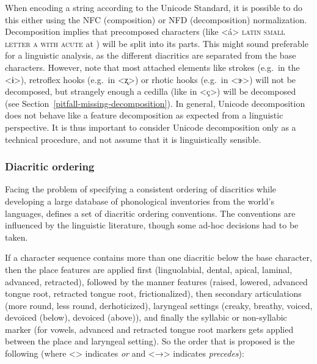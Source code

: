 When encoding a string according to the Unicode Standard, it is possible to do
this either using the NFC (composition) or NFD (decomposition) normalization.
Decomposition implies that precomposed characters (like <á> \textsc{latin small
letter a with acute} at ) will be split into its parts. This might
sound preferable for a linguistic analysis, as the different diacritics are
separated from the base characters. However, note that most attached elements
like strokes (e.g.~in the <ɨ>), retroflex hooks (e.g.~in <ʐ>) or rhotic hooks
(e.g.~in <ɝ>) will not be decomposed, but strangely enough a cedilla (like in
<ç>) will be decomposed (see Section~\ref{pitfall-missing-decomposition}). In
general, Unicode decomposition does not behave like a feature decomposition as
expected from a linguistic perspective. It is thus important to consider Unicode
decomposition only as a technical procedure, and not assume that it is
linguistically sensible.

\subsubsection*{Diacritic ordering}

Facing the problem of specifying a consistent ordering of diacritics while
developing a large database of phonological inventories from the world's
languages, \citet[540]{Moran2012} defines a set of diacritic ordering
conventions. The conventions are influenced by the linguistic literature, though
some ad-hoc decisions had to be taken. 

If a character sequence contains more than one diacritic below the base
character, then the place features are applied first (linguolabial, dental,
apical, laminal, advanced, retracted), followed by the manner features (raised,
lowered, advanced tongue root, retracted tongue root, frictionalized), then
secondary articulations (more round, less round, derhoticized), laryngeal
settings (creaky, breathy, voiced, devoiced (below), devoiced (above)), and
finally the syllabic or non-syllabic marker (for vowels, advanced and retracted
tongue root markers gets applied between the place and laryngeal setting). So
the order that is proposed is the following (where <\textbar{}> indicates
\textit{or} and <→> indicates \textit{precedes}):

